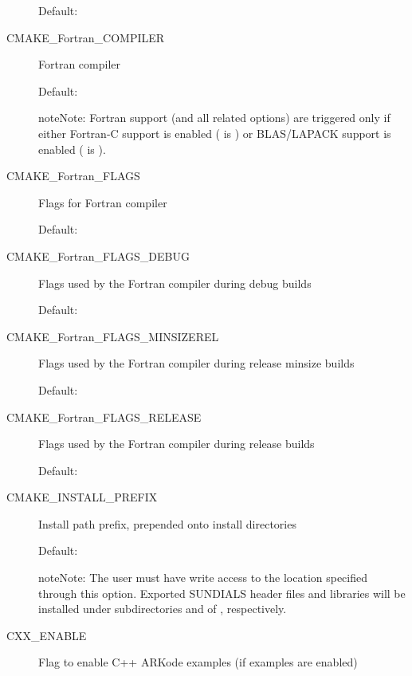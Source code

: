 \documentclass[letterpaper,10pt,english]{sphinxmanual}
\begin{document}
\begin{description}
Default: 

\item[{\index{CMAKE\_Fortran\_COMPILER (CMake option)}CMAKE\_Fortran\_COMPILER}] \leavevmode
Fortran compiler

Default: 

\begin{notice}{note}{Note:}
Fortran support (and all related options) are triggered only
if either Fortran-C support is enabled ( is ) or
BLAS/LAPACK support is enabled ( is ).
\end{notice}

\item[{\index{CMAKE\_Fortran\_FLAGS (CMake option)}CMAKE\_Fortran\_FLAGS}] \leavevmode
Flags for Fortran compiler

Default:

\item[{\index{CMAKE\_Fortran\_FLAGS\_DEBUG (CMake option)}CMAKE\_Fortran\_FLAGS\_DEBUG}] \leavevmode
Flags used by the Fortran compiler during debug
builds

Default: 

\item[{\index{CMAKE\_Fortran\_FLAGS\_MINSIZEREL (CMake option)}CMAKE\_Fortran\_FLAGS\_MINSIZEREL}] \leavevmode
Flags used by the Fortran compiler during
release minsize builds

Default: 

\item[{\index{CMAKE\_Fortran\_FLAGS\_RELEASE (CMake option)}CMAKE\_Fortran\_FLAGS\_RELEASE}] \leavevmode
Flags used by the Fortran compiler during
release builds

Default: 

\item[{\index{CMAKE\_INSTALL\_PREFIX (CMake option)}CMAKE\_INSTALL\_PREFIX}] \leavevmode
Install path prefix, prepended onto install
directories

Default: 

\begin{notice}{note}{Note:}
The user must have write access to the location specified
through this option. Exported SUNDIALS header files and libraries
will be installed under subdirectories  and  of
, respectively.
\end{notice}

\item[{\index{CXX\_ENABLE (CMake option)}CXX\_ENABLE}] \leavevmode
Flag to enable C++ ARKode examples (if examples are enabled)


\end{description}
\end{document}
